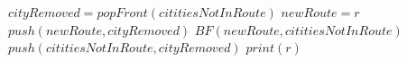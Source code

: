             \State $cityRemoved = popFront(cititiesNotInRoute)$
            \State $newRoute = r$
            \State $push(newRoute, cityRemoved)$
            \State $BF(newRoute, cititiesNotInRoute)$
            \State $push(cititiesNotInRoute, cityRemoved)$
        \EndFor
    \EndIf
        \State $print(r)$
    \EndIf
\EndProcedure